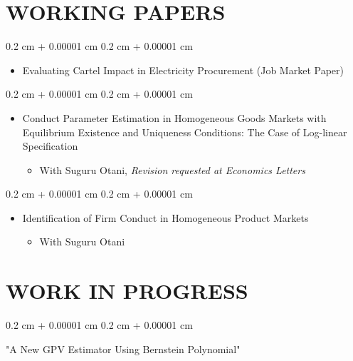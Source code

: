 \documentclass[10pt, letterpaper]{article}
\newenvironment{highlights}{
    \begin{itemize}[
        topsep=0.10 cm,
        parsep=0.10 cm,
        partopsep=0pt,
        itemsep=0.0 cm,
        leftmargin=0.4 cm + 10pt
    ]
}{
    \end{itemize}
} %
\newenvironment{onecolentry}{
    \begin{adjustwidth}{
        0.2 cm + 0.00001 cm
    }{
        0.2 cm + 0.00001 cm
    }
}{
    \end{adjustwidth}
} %
\begin{document}
    \section{WORKING PAPERS}
    \begin{samepage}
        \begin{onecolentry}
            \begin{highlights}
                \item Evaluating Cartel Impact in Electricity Procurement (Job Market Paper)
            \end{highlights}
        \end{onecolentry}
    \end{samepage}
    \vspace{0.10 cm}
    \begin{samepage}
        \begin{onecolentry}
            \begin{highlights}
                \item Conduct Parameter Estimation in Homogeneous Goods Markets with Equilibrium Existence and Uniqueness Conditions: The Case of Log-linear Specification
                \begin{highlights}
                    \item With Suguru Otani, \textit{Revision requested at Economics Letters}
                \end{highlights}
            \end{highlights}
        \end{onecolentry}
        \begin{onecolentry}
            \begin{highlights}
                \item Identification of Firm Conduct in Homogeneous Product Markets
                \begin{highlights}
                    \item With Suguru Otani
                \end{highlights}
            \end{highlights}
        \end{onecolentry}
    \end{samepage}

    \section{WORK IN PROGRESS}
    \begin{onecolentry}
        "A New GPV Estimator Using Bernstein Polynomial"
    \end{onecolentry}
\end{document}
